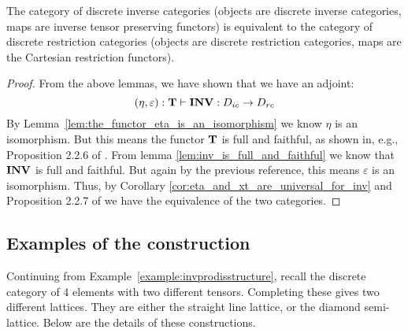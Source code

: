 \begin{theorem}\label{thm:discrete_inverse_categories_are_equivalent_to_discrete_restriction_categories}
  The category of discrete inverse categories (objects are discrete inverse categories, maps are
  inverse tensor preserving functors) is equivalent to the category of discrete restriction
  categories (objects are discrete restriction categories, maps are the Cartesian restriction
  functors).
\end{theorem}
\begin{proof}
  From the above lemmas, we have shown that we have an adjoint:
  \begin{equation}
    (\eta,\varepsilon):\mathbf{T} \vdash \mathbf{INV} :D_{i c} \to D_{r c} \label{eq:inv_and_wtf_are_adjoint_pair}
  \end{equation}
  By Lemma~\ref{lem:the_functor_eta_is_an_isomorphism} we know $\eta$ is an isomorphism. But this
  means the functor $\mathbf{T}$ is full and faithful, as shown in, e.g., Proposition 2.2.6 of
  \cite{cockett2009:ctcs}. From lemma \ref{lem:inv_is_full_and_faithful} we know that $\mathbf{INV}$ is
  full and faithful. But again by the previous reference, this means $\varepsilon$ is an
  isomorphism. Thus, by Corollary \ref{cor:eta_and_xt_are_universal_for_inv} and Proposition 2.2.7
  of \cite{cockett2009:ctcs} we have the equivalence of the two categories.
\end{proof}
\subsection{Examples of the \texorpdfstring{\wtc}{tilde} construction} %
\label{sub:examples_of_the_wtf_construction}

\begin{example}
  \label{example:completing_a_finite_discrete_inverse_category}
\end{example}
Continuing from Example~\ref{example:invprodisstructure}, recall the discrete category of 4
elements with two different tensors. Completing these gives two different lattices. They are either
the straight line lattice, or the diamond semi-lattice. Below are the details of these constructions.

